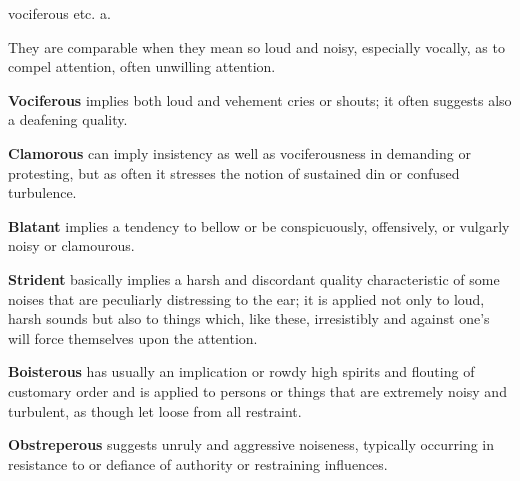 \begin{description}[style=unboxed]
{vociferous etc.} a.
\begin{mynewitemize}
\item They are comparable when they mean so loud and noisy, especially vocally,
as to compel attention, often unwilling attention.
\item \textbf{Vociferous} implies both loud and vehement cries or shouts; it
often suggests also a deafening quality.
\item \textbf{Clamorous} can imply insistency as well as vociferousness in 
demanding or protesting, but as often it stresses the notion of sustained 
din or confused turbulence.
\item \textbf{Blatant} implies a tendency to bellow or be conspicuously, 
offensively, or vulgarly noisy or clamourous.
\item \textbf{Strident} basically implies a harsh and discordant quality 
characteristic of some noises that are peculiarly distressing to the ear;
it is applied not only to loud, harsh sounds but also to things which, like 
these, irresistibly and against one's will force themselves upon the attention.
\item \textbf{Boisterous} has usually an implication or rowdy high spirits
and flouting of customary order and is applied to persons or things that are 
extremely noisy and turbulent, as though let loose from all restraint.
\item \textbf{Obstreperous} suggests unruly and aggressive noiseness, typically
occurring in resistance to or defiance of authority or restraining influences.
\end{mynewitemize}


\end{description}
